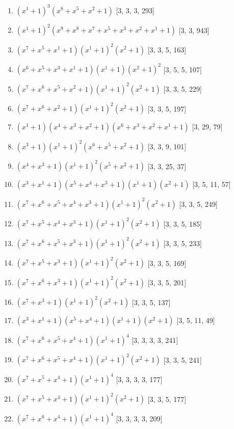 \documentclass[10pt,twocolumn]{article}
\begin{document}
\begin{enumerate}
\item $(x^{1} + 1)^{3}(x^{8} + x^{5} + x^{2} + 1)$  [3, 3, 3, 293]
\item $(x^{1} + 1)^{2}(x^{9} + x^{8} + x^{7} + x^{5} + x^{3} + x^{2} + x^{1} + 1)$  [3, 3, 943]
\item $(x^{7} + x^{5} + x^{1} + 1)(x^{1} + 1)^{2}(x^{2} + 1)$  [3, 3, 5, 163]
\item $(x^{6} + x^{5} + x^{3} + x^{1} + 1)(x^{1} + 1)(x^{2} + 1)^{2}$  [3, 5, 5, 107]
\item $(x^{7} + x^{6} + x^{5} + x^{2} + 1)(x^{1} + 1)^{2}(x^{2} + 1)$  [3, 3, 5, 229]
\item $(x^{7} + x^{6} + x^{2} + 1)(x^{1} + 1)^{2}(x^{2} + 1)$  [3, 3, 5, 197]
\item $(x^{1} + 1)(x^{4} + x^{3} + x^{2} + 1)(x^{6} + x^{3} + x^{2} + x^{1} + 1)$  [3, 29, 79]
\item $(x^{3} + 1)(x^{1} + 1)^{2}(x^{6} + x^{5} + x^{2} + 1)$  [3, 3, 9, 101]
\item $(x^{4} + x^{3} + 1)(x^{1} + 1)^{2}(x^{5} + x^{2} + 1)$  [3, 3, 25, 37]
\item $(x^{3} + x^{1} + 1)(x^{5} + x^{4} + x^{3} + 1)(x^{1} + 1)(x^{2} + 1)$  [3, 5, 11, 57]
\item $(x^{7} + x^{6} + x^{5} + x^{4} + x^{3} + 1)(x^{1} + 1)^{2}(x^{2} + 1)$  [3, 3, 5, 249]
\item $(x^{7} + x^{5} + x^{4} + x^{3} + 1)(x^{1} + 1)^{2}(x^{2} + 1)$  [3, 3, 5, 185]
\item $(x^{7} + x^{6} + x^{5} + x^{3} + 1)(x^{1} + 1)^{2}(x^{2} + 1)$  [3, 3, 5, 233]
\item $(x^{7} + x^{5} + x^{3} + 1)(x^{1} + 1)^{2}(x^{2} + 1)$  [3, 3, 5, 169]
\item $(x^{7} + x^{6} + x^{3} + 1)(x^{1} + 1)^{2}(x^{2} + 1)$  [3, 3, 5, 201]
\item $(x^{7} + x^{3} + 1)(x^{1} + 1)^{2}(x^{2} + 1)$  [3, 3, 5, 137]
\item $(x^{3} + x^{1} + 1)(x^{5} + x^{4} + 1)(x^{1} + 1)(x^{2} + 1)$  [3, 5, 11, 49]
\item $(x^{7} + x^{6} + x^{5} + x^{4} + 1)(x^{1} + 1)^{4}$  [3, 3, 3, 3, 241]
\item $(x^{7} + x^{6} + x^{5} + x^{4} + 1)(x^{1} + 1)^{2}(x^{2} + 1)$  [3, 3, 5, 241]
\item $(x^{7} + x^{5} + x^{4} + 1)(x^{1} + 1)^{4}$  [3, 3, 3, 3, 177]
\item $(x^{7} + x^{5} + x^{4} + 1)(x^{1} + 1)^{2}(x^{2} + 1)$  [3, 3, 5, 177]
\item $(x^{7} + x^{6} + x^{4} + 1)(x^{1} + 1)^{4}$  [3, 3, 3, 3, 209]

\end{enumerate}
\end{document}
